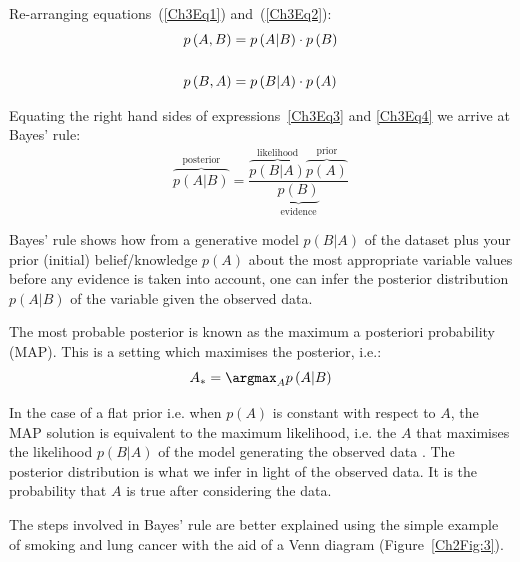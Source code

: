 Re-arranging equations~(\ref{Ch3Eq1}) and~(\ref{Ch3Eq2}):
\begin{align}
    p\left( A,B \right) & = p\left( A|B \right) \cdot p\left( B \right) \label{Ch3Eq3}\\
    &\strut\nonumber\\
    p\left( B,A \right) & = p\left( B|A \right) \cdot p\left( A \right) \label{Ch3Eq4}
\end{align}

Equating the right hand sides of expressions~\ref{Ch3Eq3} and \ref{Ch3Eq4} we arrive at Bayes' rule:
\begin{equation}
    \overbrace{p\left( A|B \right)}^{\text{posterior}} =
    \dfrac
        {
        \overbrace{p\left( B|A \right)}^{\text{likelihood}}
        \overbrace{p\left( A \right)}^{\text{prior}}
        }
        {\underbrace{p\left( B \right)}_{\text{evidence}}}
\end{equation}

Bayes' rule shows how from a generative model $p\left( B|A \right)$ of the dataset plus your prior (initial) belief/knowledge $p\left( A \right)$ about the most appropriate variable values before any evidence is taken into account, one can infer the posterior distribution $p\left( A|B \right)$ of the variable given the observed data.

The most probable posterior is known as the maximum a posteriori probability (MAP). This is a setting which maximises the posterior, i.e.:
\begin{equation}
    A_* = \argmax_A p\left( A|B \right)
\end{equation}

In the case of a flat prior i.e. when $p\left( A \right)$ is constant with respect to $A$, the MAP solution is equivalent to the maximum likelihood, i.e. the $A$ that maximises the likelihood $p\left( B|A \right)$ of the model generating the observed data \autocite{barberBRML2012}. The posterior distribution is what we infer in light of the observed data. It is the probability that $A$ is true after considering the data.

The steps involved in Bayes' rule are better explained using the simple example of smoking and lung cancer with the aid of a Venn diagram (Figure~\ref{Ch2Fig:3}).

